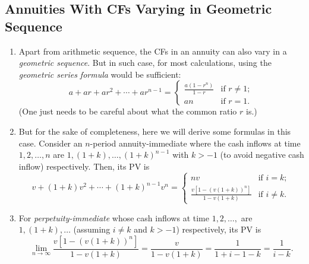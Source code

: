 \subsection{Annuities With CFs Varying in Geometric Sequence}
\begin{enumerate}
\item Apart from arithmetic sequence, the CFs in an annuity can also vary in a
\emph{geometric sequence}. But in such case, for most calculations, using the
\emph{geometric series formula} would be sufficient:
\[
a+ar+ar^2+\dotsb+ar^{n-1}
=
\begin{cases}
\displaystyle\frac{a(1-r^n)}{1-r}&\text{if \(r\ne 1\)};\\
an&\text{if \(r=1\)}.
\end{cases}
\]
(One just needs to be careful about what the common ratio \(r\) is.)

\item \label{it:pv-gs-annuity-imm}
But for the sake of completeness, here we will derive some formulas in
this case. Consider an \(n\)-period annuity-immediate where the cash inflows at
time \(1,2,\dotsc,n\) are \(1,(1+k),\dotsc,(1+k)^{n-1}\) with \(k> -1\) (to
avoid negative cash inflow) respectively. Then, its PV is \[
v+(1+k)v^2+\dotsb+(1+k)^{n-1}v^n=
\begin{cases}
nv&\text{if \(i=k\)};\\
\displaystyle \frac{v[1-(v(1+k))^{n}]}{1-v(1+k)}&\text{if \(i\ne k\)}.
\end{cases}
\]
\begin{center}
\end{center}
\item For \emph{perpetuity-immediate} whose cash inflows at time
\(1,2,\dotsc,\) are \(1,(1+k),\dotsc\) (assuming \(i\ne k\) and \(k> -1\))
respectively, its PV is
\[
\lim_{n\to \infty}\frac{v[1-(v(1+k))^{n}]}{1-v(1+k)}
=\frac{v}{1-v(1+k)}
=\frac{1}{1+i-1-k}
=\frac{1}{i-k}.
\]
\end{enumerate}
